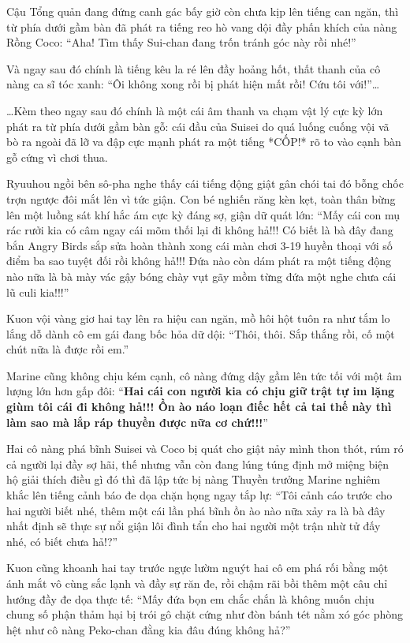 \documentclass[../main.tex]{subfiles}
\begin{document}
Cậu Tổng quản đang đứng canh gác bấy giờ còn chưa kịp lên tiếng can ngăn, thì từ phía dưới gầm bàn đã phát ra tiếng reo hò vang dội đầy phấn khích của nàng Rồng Coco: ``Aha! Tìm thấy Sui-chan đang trốn tránh góc này rồi nhé!''

Và ngay sau đó chính là tiếng kêu la ré lên đầy hoảng hốt, thất thanh của cô nàng ca sĩ tóc xanh: ``Ôi không xong rồi bị phát hiện mất rồi! Cứu tôi với!''\dots

\dots Kèm theo ngay sau đó chính là một cái âm thanh va chạm vật lý cực kỳ lớn phát ra từ phía dưới gầm bàn gỗ: cái đầu của Suisei do quá luống cuống vội vã bò ra ngoài đã lỡ va đập cực mạnh phát ra một tiếng *CỐP!* rõ to vào cạnh bàn gỗ cứng vì chơi thua.

Ryuuhou ngồi bên sô-pha nghe thấy cái tiếng động giật gân chói tai đó bỗng chốc trợn ngược đôi mắt lên vì tức giận. Con bé nghiến răng kèn kẹt, toàn thân bừng lên một luồng sát khí hắc ám cực kỳ đáng sợ, giận dữ quát lớn: ``Mấy cái con mụ rác rưởi kia có câm ngay cái mõm thối lại đi không hả!!! Có biết là bà đây đang bắn Angry Birds sắp sửa hoàn thành xong cái màn chơi 3-19 huyền thoại với số điểm ba sao tuyệt đối rồi không hả!!! Đứa nào còn dám phát ra một tiếng động nào nữa là bà mày vác gậy bóng chày vụt gãy mồm từng đứa một nghe chưa cái lũ culi kia!!!''

Kuon vội vàng giơ hai tay lên ra hiệu can ngăn, mồ hôi hột tuôn ra như tắm lo lắng dỗ dành cô em gái đang bốc hỏa dữ dội: ``Thôi, thôi. Sắp thắng rồi, cố một chút nữa là được rồi em.''

Marine cũng không chịu kém cạnh, cô nàng đứng dậy gầm lên tức tối với một âm lượng lớn hơn gấp đôi: ``\textbf{Hai cái con người kia có chịu giữ trật tự im lặng giùm tôi cái đi không hả!!! Ồn ào náo loạn điếc hết cả tai thế này thì làm sao mà lắp ráp thuyền được nữa cơ chứ!!!}''

Hai cô nàng phá bĩnh Suisei và Coco bị quát cho giật nảy mình thon thót, rúm ró cả người lại đầy sợ hãi, thế nhưng vẫn còn đang lúng túng định mở miệng biện hộ giải thích điều gì đó thì đã lập tức bị nàng Thuyền trưởng Marine nghiêm khắc lên tiếng cảnh báo đe dọa chặn họng ngay tắp lự: ``Tôi cảnh cáo trước cho hai người biết nhé, thêm một cái lần phá bĩnh ồn ào nào nữa xảy ra là bà đây nhất định sẽ thực sự nổi giận lôi đình tẩn cho hai người một trận nhừ tử đấy nhé, có biết chưa hả!?''

Kuon cũng khoanh hai tay trước ngực lườm nguýt hai cô em phá rối bằng một ánh mắt vô cùng sắc lạnh và đầy sự răn đe, rồi chậm rãi bồi thêm một câu chỉ hướng đầy đe dọa thực tế: ``Mấy đứa bọn em chắc chắn là không muốn chịu chung số phận thảm hại bị trói gô chặt cứng như đòn bánh tét nằm xó góc phòng hệt như cô nàng Peko-chan đằng kia đâu đúng không hả?''
\end{document}
